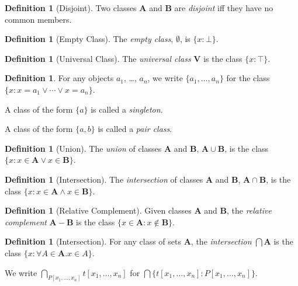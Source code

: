 \documentclass{report}
\theoremstyle{definition}
\newtheorem{definition}[axiom]{Definition}
\begin{document}
    \begin{definition}[Disjoint]
        Two classes $\mathbf{A}$ and $\mathbf{B}$ are \emph{disjoint} iff they have no common members.
    \end{definition}

    \begin{definition}[Empty Class]
        The \emph{empty class}, $\emptyset$, is $\{ x : \bot \}$.
    \end{definition}

    \begin{definition}[Universal Class]
        The \emph{universal class} $\mathbf{V}$ is the class $\{ x : \top \}$.
    \end{definition}

    \begin{definition}
        For any objects $a_1$, \ldots, $a_n$, we write $\{ a_1, \ldots, a_n \}$ for the class
        $\{ x : x = a_1 \vee \cdots \vee x = a_n \}$.

        A class of the form $\{a\}$ is called a \emph{singleton}.

        A class of the form $\{a,b\}$ is called a \emph{pair class}.
    \end{definition}

    \begin{definition}[Union]
        The \emph{union} of classes $\mathbf{A}$ and $\mathbf{B}$, 
        $\mathbf{A} \cup \mathbf{B}$, is the class $\{ x : x \in \mathbf{A} \vee x \in \mathbf{B} \}$.
    \end{definition}

    \begin{definition}[Intersection]
        The \emph{intersection} of classes $\mathbf{A}$ and $\mathbf{B}$, 
        $\mathbf{A} \cap \mathbf{B}$, is the class $\{ x : x \in \mathbf{A} \wedge x \in \mathbf{B} \}$.
    \end{definition}

    \begin{definition}[Relative Complement]
        Given classes $\mathbf{A}$ and $\mathbf{B}$, the \emph{relative complement}
        $\mathbf{A} - \mathbf{B}$ is the class $\{ x \in \mathbf{A} : x \notin \mathbf{B} \}$.
    \end{definition}

    \begin{definition}[Intersection]
        For any class of sets $\mathbf{A}$, the \emph{intersection} $\bigcap \mathbf{A}$ is the class
        $\{ x : \forall A \in \mathbf{A}. x \in A \}$.

        We write $\bigcap_{P[x_1, \ldots, x_n]} t[x_1, \ldots, x_n]$ for $\bigcap \{ t[x_1, \ldots, x_n]
        : P[x_1, \ldots, x_n] \}$.
    \end{definition}
\end{document}
